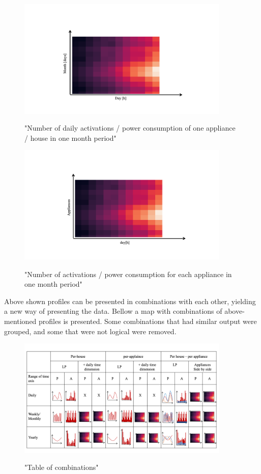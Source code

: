 \begin{figure}[H]
	\centering
	\caption{"Number of daily activations / power consumption of one appliance / house in one month period"}
	\includegraphics[width=0.9\textwidth]{Figures/profile_sketches/Slide10.png}
	\label{fig:heatmap_2dtime}
\end{figure}
\begin{figure}[H]
	\centering
	\caption{"Number of activations / power consumption for each appliance in one month period"}
	\includegraphics[width=0.9\textwidth]{Figures/profile_sketches/Slide12.png}
	\label{fig:heatmap_all_appl}
\end{figure}

Above shown profiles can be presented in combinations with each other, yielding a new way of presenting the data.
Bellow a map with combinations of above-mentioned profiles is presented. Some combinations that had similar output were grouped,
and some that were not logical were removed.  

\begin{figure}[H]
	\centering
	\caption{"Table of combinations"}
	\includegraphics[width=0.9\textwidth]{Figures/profile_sketches/Slide14.png}
	\label{fig:map_fig}
\end{figure}

